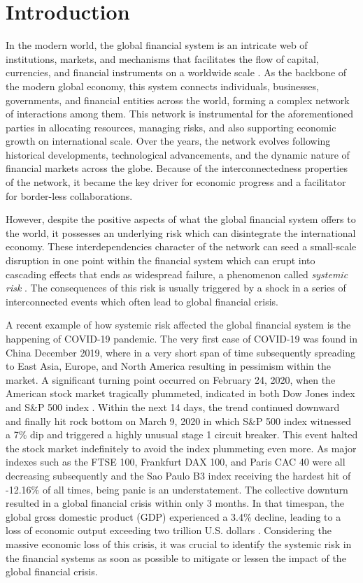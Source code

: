\documentclass[a4paper,11pt]{article}
\begin{document}
\section{Introduction}
In the modern world, the global financial system is an intricate web of institutions, markets, and mechanisms that facilitates the flow of capital, currencies, and financial instruments on a worldwide scale \citep{Investopedia_2019}. As the backbone of the modern global economy, this system connects individuals, businesses, governments, and financial entities across the world, forming a complex network of interactions among them. This network is instrumental for the aforementioned parties in allocating resources, managing risks, and also supporting economic growth on international scale. Over the years, the network evolves following historical developments, technological advancements, and the dynamic nature of financial markets across the globe. Because of the interconnectedness properties of the network, it became the key driver for economic progress and a facilitator for border-less collaborations.

However, despite the positive aspects of what the global financial system offers to the world, it possesses an underlying risk which can disintegrate the international economy. These interdependencies character of the network can seed  a small-scale disruption in one point within  the financial system which can erupt into cascading effects that ends as widespread failure, a phenomenon called \textit{systemic risk} \citep{Allen_Carletti_2013}. The consequences of this risk is usually triggered by a shock in a series of interconnected events which often lead to global financial crisis.

A recent example of how systemic risk affected the global financial system is the happening of COVID-19 pandemic. The very first case of COVID-19 was found in China December 2019, where in a very short span of time subsequently spreading to East Asia, Europe, and North America resulting in pessimism within the market. A significant turning point occurred on February 24, 2020, when the American stock market tragically plummeted, indicated in both Dow Jones index and S\&P 500 index \citep{Statista_2024}. Within the next 14 days, the trend continued downward and finally hit rock bottom on March 9, 2020 in which S\&P 500 index witnessed a 7\% dip and triggered a highly unusual stage 1 circuit breaker. This event halted the stock market indefinitely to avoid the index plummeting even more. As major indexes such as the FTSE 100, Frankfurt DAX 100, and Paris CAC 40 were all decreasing subsequently and the Sao Paulo B3 index receiving the hardest hit of -12.16\% of all times, being panic is an understatement. The collective downturn resulted in a global financial crisis within only 3 months. In that timespan, the global gross domestic product (GDP) experienced a 3.4\% decline, leading to a loss of economic output exceeding two trillion U.S. dollars \citep{Dyvik_2024}. Considering the massive economic loss of this crisis, it was crucial to identify the systemic risk in the financial systems as soon as possible to mitigate or lessen the impact of the global financial crisis.
\end{document}
